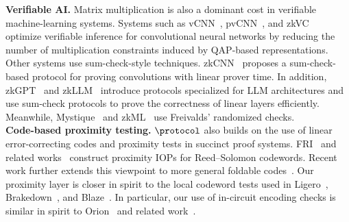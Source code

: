

\noindent\textbf{Verifiable AI.}
Matrix multiplication is also a dominant cost in verifiable machine-learning
systems. Systems such as vCNN~\cite{lee2024vcnn}, pvCNN~\cite{pvCNN}, and
zkVC~\cite{zhang2025zkvc} optimize verifiable inference for convolutional neural
networks by reducing the number of multiplication constraints induced by
QAP-based representations. Other systems use sum-check-style techniques.
zkCNN~\cite{liu2021zkcnn} proposes a sum-check-based protocol for proving
convolutions with linear prover time. In addition, zkGPT~\cite{zkGPT} and
zkLLM~\cite{zkLLM} introduce protocols specialized for LLM architectures and
use sum-check protocols to prove the correctness of linear layers efficiently.
Meanwhile, Mystique~\cite{weng2021mystique} and zkML~\cite{chen2024zkml} use
Freivalds' randomized checks. \\

\noindent\textbf{Code-based proximity testing.}
\(\protocol\) also builds on the use of linear error-correcting codes and proximity
tests in succinct proof systems. FRI~\cite{FRI} and related
works~\cite{STIR,WHIR} construct proximity IOPs for
Reed--Solomon codewords. Recent work further extends this viewpoint to more
general foldable codes~\cite{basefold}.
Our proximity layer is closer in spirit to the local codeword tests used in
Ligero~\cite{Ligero}, Brakedown~\cite{golovnev2023brakedown}, and
Blaze~\cite{blaze}. In particular, our use of in-circuit encoding checks is similar in spirit to Orion~\cite{orion} and related work~\cite{restoring_orion}.

